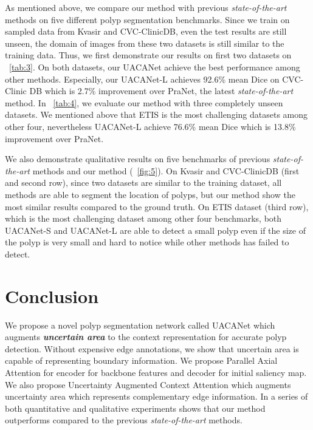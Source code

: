 \documentclass[sigconf]{acmart}
\begin{document}
As mentioned above, we compare our method with previous \textit{state-of-the-art} methods on five different polyp segmentation benchmarks. Since we train on sampled data from Kvasir and CVC-ClinicDB, even the test results are still unseen, the domain of images from these two datasets is still similar to the training data. Thus, we first demonstrate our results on first two datasets on \tableautorefname~\ref{tab:3}. On both datasets, our UACANet achieve the best performance among other methods. Especially, our UACANet-L achieves 92.6\% mean Dice on CVC-Clinic DB which is 2.7\% improvement over PraNet, the latest \textit{state-of-the-art} method. In \tableautorefname~\ref{tab:4}, we evaluate our method with three completely unseen datasets. We mentioned above that ETIS is the most challenging datasets among other four, nevertheless UACANet-L achieve 76.6\% mean Dice which is 13.8\% improvement over PraNet.

We also demonstrate qualitative results on five benchmarks of previous \textit{state-of-the-art} methods and our method (\figureautorefname~\ref{fig:5}). On Kvasir and CVC-ClinicDB (first and second row), since two datasets are similar to the training dataset, all methods are able to segment the location of polyps, but our method show the most similar results compared to the ground truth. On ETIS dataset (third row), which is the most challenging dataset among other four benchmarks, both UACANet-S and UACANet-L are able to detect a small polyp even if the size of the polyp is very small and hard to notice while other methods has failed to detect. 


\section{Conclusion}

We propose a novel polyp segmentation network called UACANet which augments \textbf{\textit{uncertain area}} to the context representation for accurate polyp detection. Without expensive edge annotations, we show that uncertain area is capable of representing boundary information. We propose Parallel Axial Attention for encoder for backbone features and decoder for initial saliency map. We also propose Uncertainty Augmented Context Attention which augments uncertainty area which represents complementary edge information. In a series of both quantitative and qualitative experiments shows that our method outperforms compared to the previous \textit{state-of-the-art} methods.
\end{document}
